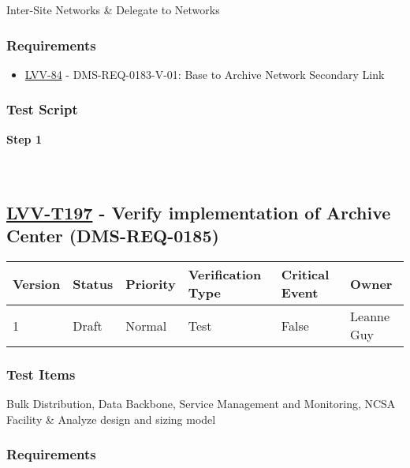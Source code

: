Inter-Site Networks \& Delegate to Networks

\hypertarget{requirements-173}{%
\subsubsection{Requirements}\label{requirements-173}}

\begin{itemize}
\tightlist
\item
  \href{https://jira.lsstcorp.org/browse/LVV-84}{LVV-84} -
  DMS-REQ-0183-V-01: Base to Archive Network Secondary Link
\end{itemize}

\hypertarget{test-script-173}{%
\subsubsection{Test Script}\label{test-script-173}}

\textbf{Step 1}\\
~\\
~\\

\hypertarget{lvv-t197---verify-implementation-of-archive-center-dms-req-0185}{%
\subsection{\texorpdfstring{\href{https://jira.lsstcorp.org/secure/Tests.jspa\#/testCase/LVV-T197}{LVV-T197}
- Verify implementation of Archive Center
(DMS-REQ-0185)}{LVV-T197 - Verify implementation of Archive Center (DMS-REQ-0185)}}\label{lvv-t197---verify-implementation-of-archive-center-dms-req-0185}}

\begin{longtable}[]{@{}llllll@{}}
\toprule
Version & Status & Priority & Verification Type & Critical Event &
Owner\tabularnewline
\midrule
\endhead
1 & Draft & Normal & Test & False & Leanne Guy\tabularnewline
\bottomrule
\end{longtable}

\hypertarget{test-items-173}{%
\subsubsection{Test Items}\label{test-items-173}}

Bulk Distribution, Data Backbone, Service Management and Monitoring,
NCSA Facility \& Analyze design and sizing model

\hypertarget{requirements-174}{%
\subsubsection{Requirements}\label{requirements-174}}

